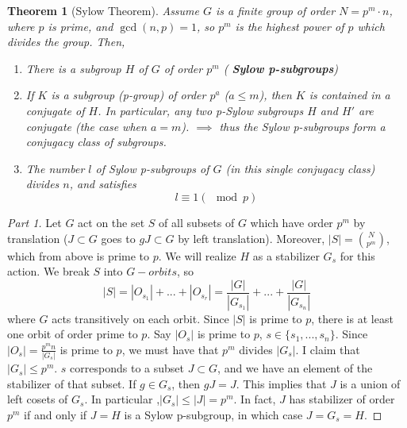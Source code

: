 \documentclass[12pt]{article}
\newtheorem{thm}{Theorem}[section]
\theoremstyle{definition}
\theoremstyle{remark}
\numberwithin{equation}{section}
\newcommand\B[1]{\textbf{ #1}}
\begin{document}
\vspace{15pt}

\begin{thm}[Sylow Theorem]
        Assume $G$ is a finite group of order $N = p^m\cdot n$, where $p$ is prime, and $\gcd(n,p) = 1$, so $p^m$ is the highest power of $p$ which divides the group. Then, \begin{enumerate}
                \item There is a subgroup $H$ of $G$ of order $p^m$ (\B{Sylow p-subgroups})
                \item If $K$ is a subgroup (p-group) of order $p^a$ ($a \leq m$), then $K$ is contained in a conjugate of $H$. In particular, any two p-Sylow subgroups $H$ and $H'$ are conjugate (the case when $a = m$). $\implies$ thus the Sylow p-subgroups form a conjugacy class of subgroups.
                \item The number $l$ of Sylow p-subgroups of $G$ (in this single conjugacy class) divides $n$, and satisfies \begin{equation}
                                l \equiv 1 (\mod p)
                \end{equation}
        \end{enumerate}
\end{thm}
\begin{proof}[Part 1]
        Let $G$ act on the set $S$ of all subsets of $G$ which have order $p^m$ by translation ($J\subset G$ goes to $gJ \subset G$ by left translation). Moreover, $|S| = \binom{N}{p^m}$, which from above is prime to $p$. We will realize $H$ as a stabilizer $G_s$ for this action. We break $S$ into $G-orbits$, so \begin{equation}
                |S| = |O_{s_1}| + ... + |O_{s_r}| = \frac{|G|}{|G_{s_1}|} + ... + \frac{|G|}{|G_{s_n}|}
        \end{equation}
        where  $G$ acts transitively on each orbit. Since $|S|$ is prime to $p$, there is at least one orbit of order prime to $p$. Say $|O_s|$ is prime to $p$, $s \in \{s_1,...,s_n\}$. Since $|O_s| = \frac{p^mn}{|G_s|}$ is prime to $p$, we must have that $p^m$ divides $|G_s|$. I claim that $|G_s| \leq p^m$. $s$ corresponds to a subset $J \subset G$, and we have an element of the stabilizer of that subset. If $g \in G_s$, then $gJ = J$. This implies that $J$ is a union of left cosets of $G_s$. In particular ,$|G_s| \leq |J| = p^m$. In fact, $J$ has stabilizer of order $p^m$ if and only if $J = H$ is a Sylow p-subgroup, in which case $J = G_s = H$.
\end{proof}
\end{document}
